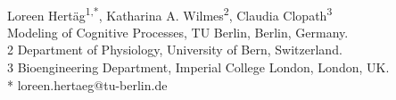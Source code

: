 \documentclass[10pt,a4paper]{article}
\begin{document}
\thispagestyle{empty}

\begin{flushleft}
{\Large
\textbf{} %
}
\newline
\\
Loreen Hert\"ag\textsuperscript{1,*},
Katharina A. Wilmes\textsuperscript{2},
Claudia Clopath\textsuperscript{3}
\\
 Modeling of Cognitive Processes, TU Berlin, Berlin, Germany.\\
2 Department of Physiology, University of Bern, Switzerland.\\
3 Bioengineering Department, Imperial College London, London, UK.
\\
\bigskip
* loreen.hertaeg@tu-berlin.de

\end{flushleft}

\end{document}

